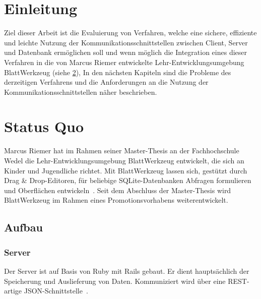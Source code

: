 
\chapter{Einleitung}
\label{sec:requirements}

Ziel dieser Arbeit ist die Evaluierung von Verfahren, welche eine sichere, effiziente und leichte Nutzung der Kommunikationsschnittstellen 
zwischen Client, Server und Datenbank ermöglichen soll und wenn möglich die Integration eines dieser Verfahren
in die von Marcus Riemer entwickelte Lehr-Entwicklungsumgebung BlattWerkzeug (siehe \ref{sec:requirements:existing}), 
In den nächsten Kapiteln sind die Probleme des derzeitigen Verfahrens und die Anforderungen an die Nutzung der Kommunikationsschnittstellen näher beschrieben.

\chapter{Status Quo}
\label{sec:requirements:existing}

Marcus Riemer hat im Rahmen seiner Master-Thesis an der Fachhochschule Wedel die Lehr-Entwicklungsumgebung BlattWerkzeug entwickelt,
die sich an Kinder und Jugendliche richtet. Mit BlattWerkzeug lassen sich, gestützt durch Drag \& Drop-Edi\-toren,
für beliebige SQLite-Datenbanken Abfragen formulieren und Oberflächen entwickeln~\cite[2]{riemer2016}.
Seit dem Abschluss der Master-Thesis wird BlattWerkzeug im Rahmen eines Promotionsvorhabens weiterentwickelt. 

\section{Aufbau}

\subsection{Server}

Der Server ist auf Basis von Ruby mit Rails gebaut. Er dient hauptsächlich der Speicherung und Auslieferung von Daten. 
Kommuniziert wird über eine REST-artige JSON-Schnittstelle~\cite[94]{riemer2016}. 

